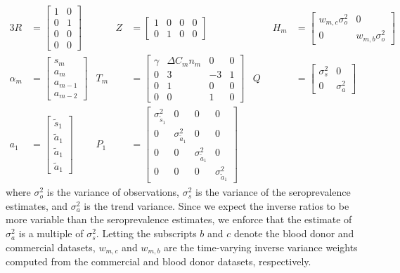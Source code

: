 \documentclass{article}
\begin{document}
\begin{alignat*}{3}
R &= \begin{bmatrix}
1 & 0  \\ 
0 & 1 \\ 
0 & 0 \\ 
0 & 0 
\end{bmatrix} &\qquad 
Z &= \begin{bmatrix}
1 & 0 & 0 & 0 \\ 
0 & 1 & 0 & 0 
\end{bmatrix} &\qquad 
H_m &= \begin{bmatrix} %
w_{m,c}\sigma^2_o & 0 \\ 
0 & w_{m,b}\sigma^2_o
\end{bmatrix} \\
\alpha_m &= \begin{bmatrix}
s_{m}\\
a_m\\ 
a_{m-1}\\ 
a_{m-2}
\end{bmatrix} & 
T_m &= \begin{bmatrix}
 \gamma & \Delta C_m n_m & 0 & 0\\ 
 0 & 3 & -3 & 1 \\ 
 0 & 1 & 0 & 0\\ 
 0 & 0 & 1 & 0
\end{bmatrix}  & 
Q &= \begin{bmatrix} 
\sigma^2_s & 0  \\ 
0 & \sigma^2_a
\end{bmatrix} \\
a_1 &= \begin{bmatrix}
\tilde{s}_{1}\\ 
\tilde{a}_1\\ 
\tilde{a}_1 \\
\tilde{a}_1
\end{bmatrix} & 
P_{1} &= \begin{bmatrix}
\sigma^2_{\tilde{s}_{1}} & 0 & 0 & 0 \\ 
0 & \sigma^2_{\tilde{a}_1} & 0 & 0\\ 
0 & 0 & \sigma^2_{\tilde{a}_1} & 0 \\ 
0 & 0 & 0 & \sigma^2_{\tilde{a}_1}
\end{bmatrix} 
\end{alignat*}
where $\sigma^2_o$ is the variance of observations,
$\sigma^2_s$ is the variance of the seroprevalence estimates, 
and $\sigma^2_a$ is the trend variance. Since we expect the 
inverse ratios to be more variable than the seroprevalence estimates, 
we enforce that the estimate of $\sigma^2_a$ is a multiple of 
$\sigma^2_s$. Letting the subscripts $b$ and $c$ denote
the blood donor and commercial datasets, $w_{m,c}$ and $w_{m,b}$ are the
time-varying inverse variance weights computed from the commercial and blood
donor datasets, respectively. 
\end{document}
